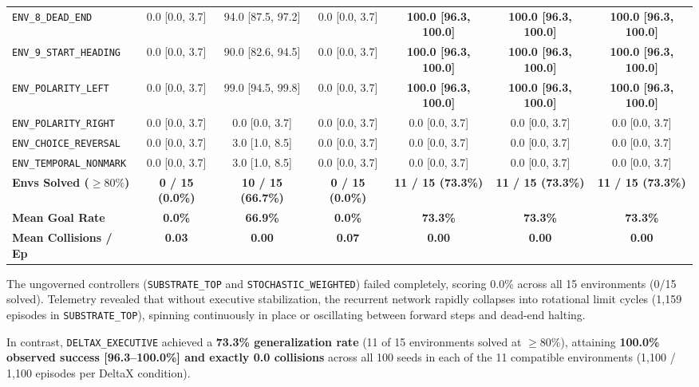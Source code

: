 \documentclass[10pt,letterpaper]{article}
\begin{document}
\begin{table}[t]
\begin{tabular*}{\textwidth}{@{\extracolsep{\fill}}lcccccc@{}}
\texttt{ENV\_8\_DEAD\_END} & 0.0 [0.0, 3.7] & 94.0 [87.5, 97.2] & 0.0 [0.0, 3.7] & \textbf{100.0 [96.3, 100.0]} & \textbf{100.0 [96.3, 100.0]} & \textbf{100.0 [96.3, 100.0]} \\
\texttt{ENV\_9\_START\_HEADING} & 0.0 [0.0, 3.7] & 90.0 [82.6, 94.5] & 0.0 [0.0, 3.7] & \textbf{100.0 [96.3, 100.0]} & \textbf{100.0 [96.3, 100.0]} & \textbf{100.0 [96.3, 100.0]} \\
\texttt{ENV\_POLARITY\_LEFT} & 0.0 [0.0, 3.7] & 99.0 [94.5, 99.8] & 0.0 [0.0, 3.7] & \textbf{100.0 [96.3, 100.0]} & \textbf{100.0 [96.3, 100.0]} & \textbf{100.0 [96.3, 100.0]} \\
\texttt{ENV\_POLARITY\_RIGHT} & 0.0 [0.0, 3.7] & 0.0 [0.0, 3.7] & 0.0 [0.0, 3.7] & 0.0 [0.0, 3.7] & 0.0 [0.0, 3.7] & 0.0 [0.0, 3.7] \\
\texttt{ENV\_CHOICE\_REVERSAL} & 0.0 [0.0, 3.7] & 3.0 [1.0, 8.5] & 0.0 [0.0, 3.7] & 0.0 [0.0, 3.7] & 0.0 [0.0, 3.7] & 0.0 [0.0, 3.7] \\
\texttt{ENV\_TEMPORAL\_NONMARK} & 0.0 [0.0, 3.7] & 3.0 [1.0, 8.5] & 0.0 [0.0, 3.7] & 0.0 [0.0, 3.7] & 0.0 [0.0, 3.7] & 0.0 [0.0, 3.7] \\
\midrule
\textbf{Envs Solved ($\ge 80\%$)} & \textbf{0 / 15 (0.0\%)} & \textbf{10 / 15 (66.7\%)} & \textbf{0 / 15 (0.0\%)} & \textbf{11 / 15 (73.3\%)} & \textbf{11 / 15 (73.3\%)} & \textbf{11 / 15 (73.3\%)} \\
\textbf{Mean Goal Rate} & \textbf{0.0\%} & \textbf{66.9\%} & \textbf{0.0\%} & \textbf{73.3\%} & \textbf{73.3\%} & \textbf{73.3\%} \\
\textbf{Mean Collisions / Ep} & \textbf{0.03} & \textbf{0.00} & \textbf{0.07} & \textbf{0.00} & \textbf{0.00} & \textbf{0.00} \\
\bottomrule
\end{tabular*}
\end{table}

The ungoverned controllers (\texttt{SUBSTRATE\_TOP} and \texttt{STOCHASTIC\_WEIGHTED}) failed completely, scoring 0.0\% across all 15 environments (0/15 solved). Telemetry revealed that without executive stabilization, the recurrent network rapidly collapses into rotational limit cycles (1,159 episodes in \texttt{SUBSTRATE\_TOP}), spinning continuously in place or oscillating between forward steps and dead-end halting.

In contrast, \texttt{DELTAX\_EXECUTIVE} achieved a \textbf{73.3\% generalization rate} (11 of 15 environments solved at $\ge 80\%$), attaining \textbf{100.0\% observed success [96.3--100.0\%] and exactly 0.0 collisions} across all 100 seeds in each of the 11 compatible environments (1,100 / 1,100 episodes per DeltaX condition). 
\end{document}
